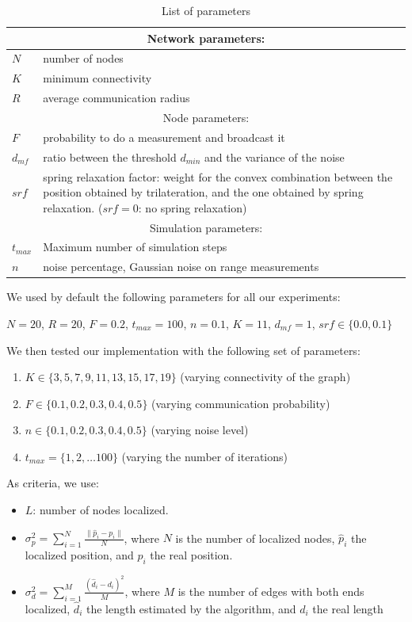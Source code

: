 \documentclass[letterpaper, 10 pt, conference]{ieeeconf}  %
\begin{document}
\begin{table}[!hbt]
\begin{tabularx}{8.4cm}{|p{1cm}|p{6.5cm}|}
\hline
\multicolumn{2}{|c|}{Network parameters:} \\
\hline
$N$ & number of nodes \\
$K$ & minimum connectivity \\
$R$ & average communication radius \\
\hline
\multicolumn{2}{|c|}{Node parameters:} \\
\hline
$F$ & probability to do a measurement and broadcast it \\
$d_{mf}$ & ratio between the threshold $d_{min}$ and the variance of the noise \\
$srf$ & spring relaxation factor: weight for the convex combination between the position obtained by trilateration, and the one obtained by spring relaxation. ($srf=0$: no spring relaxation) \\
\hline
\multicolumn{2}{|c|}{Simulation parameters:} \\
\hline
$t_{max}$ & Maximum number of simulation steps \\
$n$ & noise percentage, Gaussian noise on range measurements \\
\hline
\end{tabularx}
\caption{\label{table:parameters}List of parameters}
\end{table}

We used by default the following parameters for all our experiments: 

$N = 20$, $R = 20$, $F = 0.2$, $t_{max} = 100$, $n = 0.1$, $K = 11$, $d_{mf}=1$, $srf \in \{0.0, 0.1\}$

We then tested our implementation with the following set of parameters:

\begin{enumerate}
\item $K \in \{3, 5, 7, 9, 11, 13, 15, 17, 19\}$ (varying connectivity of the graph)
\item $F \in \{0.1, 0.2, 0.3, 0.4, 0.5\}$ (varying communication probability)
\item $n \in \{0.1, 0.2, 0.3, 0.4, 0.5\}$ (varying noise level)
\item $t_{max} = \{1, 2, \ldots 100\}$ (varying the number of iterations)
\end{enumerate}

As criteria, we use:
\begin{itemize}
\item $L$: number of nodes localized.
\item $\sigma_p^2 = \sum_{i=1}^N \frac{\|\hat p_i - p_i\|}{N}$, where $N$ is the number of localized nodes, $\hat p_i$ the localized position, and $p_i$ the real position.
\item $\sigma_d^2 = \sum_{i=1}^M \frac{(\hat d_i - d_i)^2}{M}$, where $M$ is the number of edges with both ends localized, $\hat d_i$ the length estimated by the algorithm, and $d_i$ the real length
\end{itemize}
\end{document}
